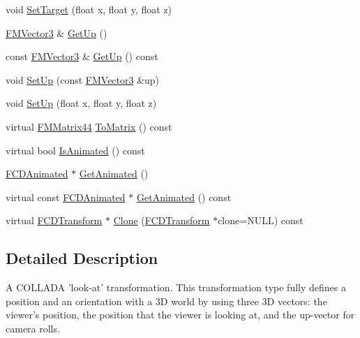 \begin{DoxyCompactItemize}
\item 
void \hyperlink{classFCDTLookAt_ae2e8e556cffefa9632db14348ceec443}{SetTarget} (float x, float y, float z)
\item 
\hyperlink{classFMVector3}{FMVector3} \& \hyperlink{classFCDTLookAt_ad41f28e486d12f68541574a8a46f8ddf}{GetUp} ()
\item 
const \hyperlink{classFMVector3}{FMVector3} \& \hyperlink{classFCDTLookAt_a47760c84b69ec97c20de9e7a56f62c43}{GetUp} () const 
\item 
void \hyperlink{classFCDTLookAt_a8c1ee30e4146902af2cf547b2abab56c}{SetUp} (const \hyperlink{classFMVector3}{FMVector3} \&up)
\item 
void \hyperlink{classFCDTLookAt_abd6938a979f2df0c452767f79beaeca7}{SetUp} (float x, float y, float z)
\item 
virtual \hyperlink{classFMMatrix44}{FMMatrix44} \hyperlink{classFCDTLookAt_a93c1f4cf120fea015977562b14bfdd1c}{ToMatrix} () const 
\item 
virtual bool \hyperlink{classFCDTLookAt_ae766dccb3bb7818195010a6007437161}{IsAnimated} () const 
\item 
\hyperlink{classFCDAnimated}{FCDAnimated} $\ast$ \hyperlink{classFCDTLookAt_a94f32a8f1ce0e88cc736e03db0da7c3f}{GetAnimated} ()
\item 
virtual const \hyperlink{classFCDAnimated}{FCDAnimated} $\ast$ \hyperlink{classFCDTLookAt_a9bae8db093d0909253dc478edbc93b40}{GetAnimated} () const 
\item 
virtual \hyperlink{classFCDTransform}{FCDTransform} $\ast$ \hyperlink{classFCDTLookAt_a94d3f8fcfd9440f451206233524620c3}{Clone} (\hyperlink{classFCDTransform}{FCDTransform} $\ast$clone=NULL) const 
\end{DoxyCompactItemize}


\subsection{Detailed Description}
A COLLADA 'look-\/at' transformation. This transformation type fully defines a position and an orientation with a 3D world by using three 3D vectors: the viewer's position, the position that the viewer is looking at, and the up-\/vector for camera rolls. 

